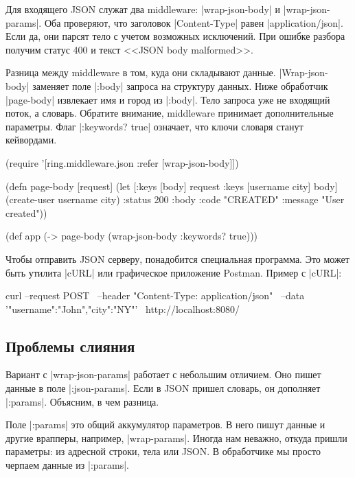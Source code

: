 Для входящего JSON служат два middleware: \spverb|wrap-json-body| и
\spverb|wrap-json-params|. Оба проверяют, что заголовок \spverb|Content-Type|
равен \spverb|application/json|. Если да, они парсят тело с учетом возможных
исключений. При ошибке разбора получим статус 400 и текст <<JSON body
malformed>>.

Разница между middleware в том, куда они складывают
данные. \spverb|Wrap-json-body| заменяет поле \spverb|:body| запроса на
структуру данных. Ниже обработчик \spverb|page-body| извлекает имя и город из
\spverb|:body|. Тело запроса уже не входящий поток, а словарь. Обратите
внимание, middleware принимает дополнительные параметры. Флаг \spverb|:keywords? true|
означает, что ключи словаря станут кейвордами.

\begin{english}
  \begin{clojure}
(require '[ring.middleware.json :refer [wrap-json-body]])

(defn page-body [request]
  (let [{:keys [body]} request
        {:keys [username city]} body]
    (create-user username city)
    {:status 200
     :body {:code "CREATED"
            :message "User created"}}))

(def app (-> page-body
             (wrap-json-body {:keywords? true})))
  \end{clojure}
\end{english}

Чтобы отправить JSON серверу, понадобится специальная программа. Это может быть
утилита \spverb|cURL| или графическое приложение Postman. Пример с
\spverb|cURL|:

\begin{english}
  \begin{bash}
curl --request POST \
     --header "Content-Type: application/json" \
     --data '{"username":"John","city":"NY"}' \
     http://localhost:8080/
  \end{bash}
\end{english}

\subsection{Проблемы слияния}

Вариант с \spverb|wrap-json-params| работает с небольшим отличием. Оно пишет
данные в поле \spverb|:json-params|. Если в JSON пришел словарь, он дополняет
\spverb|:params|. Объясним, в чем разница.

Поле \spverb|:params| это общий аккумулятор параметров. В него пишут данные и
другие врапперы, например, \spverb|wrap-params|. Иногда нам неважно, откуда
пришли параметры: из адресной строки, тела или JSON. В обработчике мы просто
черпаем данные из \spverb|:params|.

